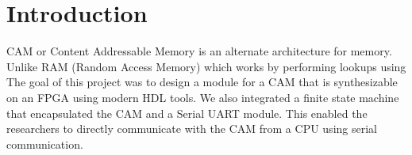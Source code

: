 \section{Introduction}
CAM or Content Addressable Memory is an alternate architecture for memory. Unlike RAM (Random Access Memory) which works by performing lookups using 
The goal of this project was to design a module for a CAM that is synthesizable on an FPGA using modern HDL tools. 
We also integrated a finite state machine that encapsulated the CAM and a Serial UART module. 
This enabled the researchers to directly communicate with the CAM from a CPU using serial communication. 
